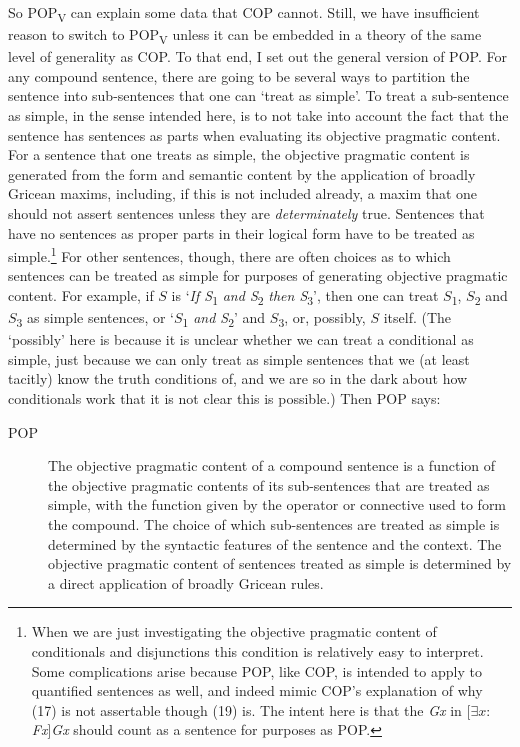 So POP\textsubscript{V} can explain some data that COP cannot. Still, we have insufficient reason to switch to POP\textsubscript{V} unless it can be embedded in a theory of the same level of generality as COP. To that end, I set out the general version of POP. For any compound sentence, there are going to be several ways to partition the sentence into sub-sentences that one can `treat as simple'. To treat a sub-sentence as simple, in the sense intended here, is to not take into account the fact that the sentence has sentences as parts when evaluating its objective pragmatic content. For a sentence that one treats as simple, the objective pragmatic content is generated from the form and semantic content by the application of broadly Gricean maxims, including, if this is not included already, a maxim that one should not assert sentences unless they are \textit{determinately} true. Sentences that have no sentences as proper parts in their logical form have to be treated as simple.\footnote{When we are just investigating the objective pragmatic content of conditionals and disjunctions this condition is relatively easy to interpret. Some complications arise because POP, like COP, is intended to apply to quantified sentences as well, and indeed mimic COP's explanation of why (17) is not assertable though (19) is. The intent here is that the \textit{Gx} in [\(\exists x\): \textit{Fx}]\textit{Gx} should count as a sentence for purposes as POP.} For other sentences, though, there are often choices as to which sentences can be treated as simple for purposes of generating objective pragmatic content. For example, if \(S\) is `\textit{If S}\textsubscript{1}\textit{ and S}\textsubscript{2} \textit{then S}\textsubscript{3}', then one can treat \(S\)\textsubscript{1}, \(S\)\textsubscript{2} and \(S\)\textsubscript{3} as simple sentences, or `\(S\)\textsubscript{1} \textit{and S}\textsubscript{2}' and \(S\)\textsubscript{3}, or, possibly, \(S\) itself. (The `possibly' here is because it is unclear whether we can treat a conditional as simple, just because we can only treat as simple sentences that we (at least tacitly) know the truth conditions of, and we are so in the dark about how conditionals work that it is not clear this is possible.) Then POP says:

\begin{description}
\item[POP] The objective pragmatic content of a compound sentence is a function of the objective pragmatic contents of its sub-sentences that are treated as simple, with the function given by the operator or connective used to form the compound. The choice of which sub-sentences are treated as simple is determined by the syntactic features of the sentence and the context. The objective pragmatic content of sentences treated as simple is determined by a direct application of broadly Gricean rules.
\end{description}

